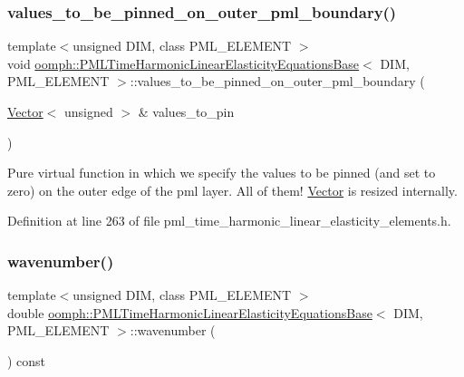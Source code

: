 \subsubsection{\texorpdfstring{values\+\_\+to\+\_\+be\+\_\+pinned\+\_\+on\+\_\+outer\+\_\+pml\+\_\+boundary()}{values\_to\_be\_pinned\_on\_outer\_pml\_boundary()}}
{\footnotesize\ttfamily template$<$unsigned D\+IM, class P\+M\+L\+\_\+\+E\+L\+E\+M\+E\+NT $>$ \\
void \hyperlink{classoomph_1_1PMLTimeHarmonicLinearElasticityEquationsBase}{oomph\+::\+P\+M\+L\+Time\+Harmonic\+Linear\+Elasticity\+Equations\+Base}$<$ D\+IM, P\+M\+L\+\_\+\+E\+L\+E\+M\+E\+NT $>$\+::values\+\_\+to\+\_\+be\+\_\+pinned\+\_\+on\+\_\+outer\+\_\+pml\+\_\+boundary (\begin{DoxyParamCaption}\item[{\hyperlink{classoomph_1_1Vector}{Vector}$<$ unsigned $>$ \&}]{values\+\_\+to\+\_\+pin }\end{DoxyParamCaption})\hspace{0.3cm}{\ttfamily [inline]}}



Pure virtual function in which we specify the values to be pinned (and set to zero) on the outer edge of the pml layer. All of them! \hyperlink{classoomph_1_1Vector}{Vector} is resized internally. 



Definition at line 263 of file pml\+\_\+time\+\_\+harmonic\+\_\+linear\+\_\+elasticity\+\_\+elements.\+h.

\mbox{\label{classoomph_1_1PMLTimeHarmonicLinearElasticityEquationsBase_ad8fefedb08d09d81b8274c537dc342a6}} 
\subsubsection{\texorpdfstring{wavenumber()}{wavenumber()}}
{\footnotesize\ttfamily template$<$unsigned D\+IM, class P\+M\+L\+\_\+\+E\+L\+E\+M\+E\+NT $>$ \\
double \hyperlink{classoomph_1_1PMLTimeHarmonicLinearElasticityEquationsBase}{oomph\+::\+P\+M\+L\+Time\+Harmonic\+Linear\+Elasticity\+Equations\+Base}$<$ D\+IM, P\+M\+L\+\_\+\+E\+L\+E\+M\+E\+NT $>$\+::wavenumber (\begin{DoxyParamCaption}{ }\end{DoxyParamCaption}) const\hspace{0.3cm}{\ttfamily [inline]}}



